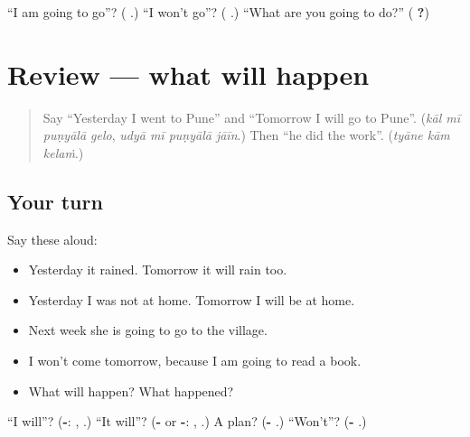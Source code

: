 \begin{tcolorbox}[breakable,colback=teal!4,colframe=teal!35!black,title={Before you move on}]
\textquotedblleft{}I am going to go\textquotedblright{}? (\textbf{  }.) \textquotedblleft{}I won't go\textquotedblright{}? (\textbf{  }.) \textquotedblleft{}What are you going to do?\textquotedblright{} (\textbf{   ?})
\end{tcolorbox}
\section[(review)]{Review — what will happen}

\label{lesson:MR-R277-what-will-happen}



\begin{quote}
Say \textquotedblleft{}Yesterday I went to Pune\textquotedblright{} and \textquotedblleft{}Tomorrow I will go to Pune\textquotedblright{}. (\emph{kāl mī puṇyālā gelo}, \emph{udyā mī puṇyālā jāīn}.) Then \textquotedblleft{}he did the work\textquotedblright{}. (\emph{tyāne kām kelaṁ}.)
\end{quote}

\subsection*{Your turn}
Say these aloud:

\begin{itemize}
\raggedright
  \item Yesterday it rained. Tomorrow it will rain too.
  \item Yesterday I was not at home. Tomorrow I will be at home.
  \item Next week she is going to go to the village.
  \item I won't come tomorrow, because I am going to read a book.
  \item What will happen? What happened?
\end{itemize}

\begin{tcolorbox}[breakable,colback=teal!4,colframe=teal!35!black,title={Before you move on}]
\textquotedblleft{}I will\textquotedblright{}? (\textbf{-}: \textbf{}, \textbf{}.) \textquotedblleft{}It will\textquotedblright{}? (\textbf{-} or \textbf{-}: \textbf{}, \textbf{}.) A plan? (\textbf{- }.) \textquotedblleft{}Won't\textquotedblright{}? (\textbf{- }.)
\end{tcolorbox}
